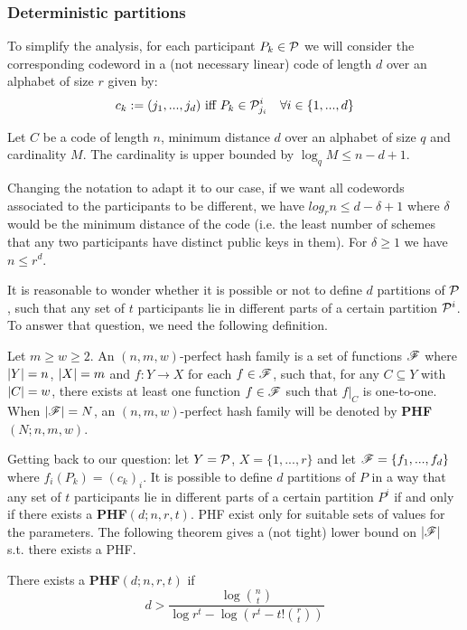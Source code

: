 \subsubsection*{Deterministic partitions}


To simplify the analysis, for each participant $P_k \in {\mathcal P}$ we will consider the corresponding codeword in a (not necessary linear) code of length $d$ over an alphabet of size $r$ given by:
$$c_k := (j_1, ... , j_d) \text{ iff } P_k \in {\mathcal P}^i_{j_i} \quad \forall i \in \{1, ..., d\}$$

\begin{thm}
Let $C$ be a code of length $n$, minimum distance $d$ over an alphabet of size $q$ and cardinality $M$. The cardinality is upper bounded by $\log_q M \leq n-d+1$.
\end{thm}

Changing the notation to adapt it to our case, if we want all codewords associated to the participants to be different, we have $log_r n \leq d - \delta + 1$ where $\delta$ would be the minimum distance of the code (i.e. the least number of schemes that any two participants have distinct public keys in them). For $\delta \geq 1$ we have $n \leq r^d$.

It is reasonable to wonder whether it is possible or not to define $d$ partitions of ${\mathcal P}$, such that any set of $t$ participants lie in different parts of a certain partition ${\mathcal P}^i$. To answer that question, we need the following definition.

 Let $m \geq w \geq 2$. An $(n,m,w)$-perfect hash family is a set of functions ${\mathscr F}$ where $\left\vert {Y} \right\vert = n$, $\left\vert {X} \right\vert = m$ and $f: Y \rightarrow X$ for each $f \in {\mathscr F}$, such that, for any $C \subseteq Y$ with $\left\vert {C} \right\vert = w$, there exists at least one function $f \in {\mathscr F}$ such that $f \vert_C$ is one-to-one. When $\left\vert {{\mathscr F}} \right\vert = N$, an $(n,m,w)$-perfect hash family will be denoted by \textbf{PHF}$(N;n,m,w)$.

Getting back to our question: let $Y = {\mathcal P}$, $X = \{1, ..., r\}$ and let ${\mathscr F} = \{f_1, ..., f_d\}$ where $f_i(P_k) = (c_k)_i$. It is possible to define $d$ partitions of $P$ in a way that any set of $t$ participants lie in different parts of a certain partition $P^i$ if and only if there exists a \textbf{PHF}$(d;n,r,t)$. PHF exist only for suitable sets of values for the parameters. The following theorem gives a (not tight) lower bound on $\left\vert {{\mathscr F}} \right\vert$ s.t. there exists a PHF.

\begin{thm}
There exists a \textbf{PHF}$(d;n,r,t)$ if
$$ d > \frac{\log \binom{n}{t}}{\log r^t - \log (r^t - t! \binom{r}{t})} $$
\end{thm}


